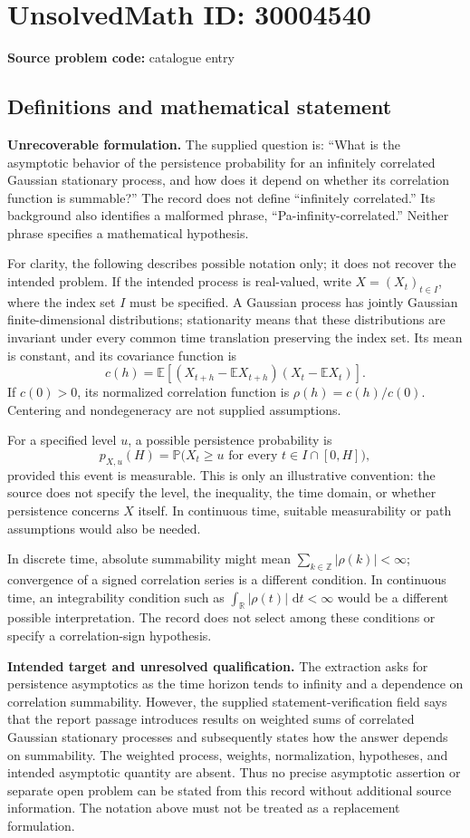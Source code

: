 \documentclass[11pt]{article}
\newcommand{\Z}{\mathbb{Z}}
\newcommand{\R}{\mathbb{R}}
\newcommand{\E}{\mathbb{E}}
\newcommand{\dd}{\,\mathrm{d}}
\begin{document}
\section*{UnsolvedMath ID: 30004540}
\textbf{Source problem code:} catalogue entry
\subsection{Definitions and mathematical statement}
\textbf{Unrecoverable formulation.} The supplied question is: ``What is the asymptotic behavior of the persistence probability for an infinitely correlated Gaussian stationary process, and how does it depend on whether its correlation function is summable?'' The record does not define ``infinitely correlated.'' Its background also identifies a malformed phrase, ``Pa-infinity-correlated.'' Neither phrase specifies a mathematical hypothesis.

For clarity, the following describes possible notation only; it does not recover the intended problem. If the intended process is real-valued, write \(X=(X_t)_{t\in I}\), where the index set \(I\) must be specified. A Gaussian process has jointly Gaussian finite-dimensional distributions; stationarity means that these distributions are invariant under every common time translation preserving the index set. Its mean is constant, and its covariance function is
\[
 c(h)=\E[(X_{t+h}-\E X_{t+h})(X_t-\E X_t)].
\]
If \(c(0)>0\), its normalized correlation function is \(\rho(h)=c(h)/c(0)\). Centering and nondegeneracy are not supplied assumptions.

For a specified level \(u\), a possible persistence probability is
\[
 p_{X,u}(H)=\mathbb P\bigl(X_t\geq u\text{ for every }t\in I\cap[0,H]\bigr),
\]
provided this event is measurable. This is only an illustrative convention: the source does not specify the level, the inequality, the time domain, or whether persistence concerns \(X\) itself. In continuous time, suitable measurability or path assumptions would also be needed.

In discrete time, absolute summability might mean \(\sum_{k\in\Z}|\rho(k)|<\infty\); convergence of a signed correlation series is a different condition. In continuous time, an integrability condition such as \(\int_{\R}|\rho(t)|\,\dd t<\infty\) would be a different possible interpretation. The record does not select among these conditions or specify a correlation-sign hypothesis.

\textbf{Intended target and unresolved qualification.} The extraction asks for persistence asymptotics as the time horizon tends to infinity and a dependence on correlation summability. However, the supplied statement-verification field says that the report passage introduces results on weighted sums of correlated Gaussian stationary processes and subsequently states how the answer depends on summability. The weighted process, weights, normalization, hypotheses, and intended asymptotic quantity are absent. Thus no precise asymptotic assertion or separate open problem can be stated from this record without additional source information. The notation above must not be treated as a replacement formulation.
\end{document}
